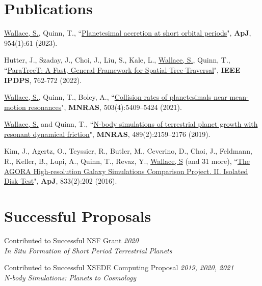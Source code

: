 \documentclass[letterpaper,11pt]{article}
\newcommand{\PaperEntry}[6]{\noindent #1, ``{#2}", \textit{#3} \textbf{#4}, #5 (#6).}
\newcommand{\ProposalEntry}[3]{#1 \hfill {\em #2} \\ \textit{#3}}
\newcommand{\resumeSubHeadingListStart}{\begin{itemize}[leftmargin=0.15in, label={}]}
\newcommand{\resumeSubHeadingListEnd}{\end{itemize}}
\begin{document}
  
  \section{Publications}
  
  \vspace{2pt}
  \resumeSubHeadingListStart
    \small{\item{

\PaperEntry{\underline{Wallace, S.}, Quinn, T.}{\href{https://doi.org/10.3847/1538-4357/ace89c}{Planetesimal accretion at short orbital periods}}{}{ApJ} {954(1):61}{2023} \\ \vspace{6pt}

\PaperEntry{Hutter, J., Szaday, J., Choi, J., Liu, S., Kale, L., \underline{Wallace, S.}, Quinn, T.}{\href{https://doi.org/10.1109/IPDPS53621.2022.00079}{ParaTreeT: A Fast, General Framework for Spatial Tree Traversal}}{}{IEEE IPDPS} {762-772}{2022} \\ \vspace{6pt}

\PaperEntry{\underline{Wallace, S.}, Quinn, T., Boley, A.}{\href{https://doi.org/10.1093/mnras/stab792}{Collision rates of planetesimals near mean-motion resonances}}{}{MNRAS} {503(4):5409–5424}{2021} \\ \vspace{6pt}

\PaperEntry{\underline{Wallace, S.} and Quinn, T.}{\href{https://doi.org/10.1093/mnras/stz2284}{N-body simulations of terrestrial planet growth with resonant dynamical friction}}{}{MNRAS}{489(2):2159–2176}{2019}  \\ \vspace{6pt}

\PaperEntry{Kim, J., Agertz, O., Teyssier, R., Butler, M., Ceverino, D., Choi, J., Feldmann, R., Keller, B., Lupi, A., Quinn, T., Revaz, Y., \underline{Wallace, S} (and 31 more)}{\href{https://doi.org/10.3847/1538-4357/833/2/202}{The AGORA High-resolution Galaxy Simulations Comparison Project. II. Isolated Disk Test}}{}{ApJ}{833(2):202}{2016} \\ \vspace{6pt}
        
    }}
  \resumeSubHeadingListEnd
  
    
\section{Successful Proposals}
  \resumeSubHeadingListStart
    \small{\item{
 
\ProposalEntry{Contributed to Successful NSF Grant}{2020}{In Situ Formation of Short Period Terrestrial Planets} \\ \vspace{6pt}

\ProposalEntry{Contributed to Successful XSEDE Computing Proposal}{2019, 2020, 2021}{N-body Simulations: Planets to Cosmology} \vspace{6pt}

 }}     
  \resumeSubHeadingListEnd
  
\end{document}
